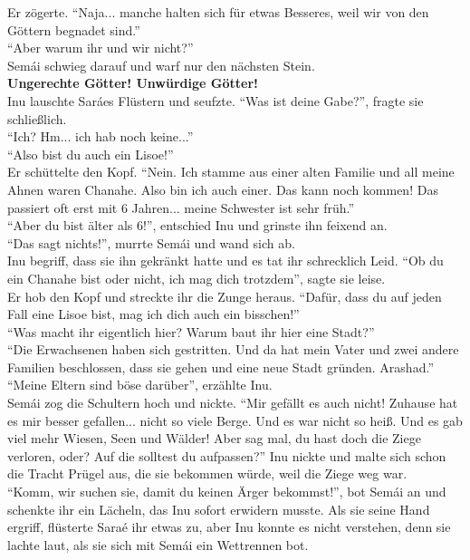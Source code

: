 Er zögerte. ``Naja... manche halten sich für etwas Besseres, weil wir von den Göttern begnadet 
sind.''\\
``Aber warum ihr und wir nicht?''\\
Semái schwieg darauf und warf nur den nächsten Stein.\\
\textbf{Ungerechte Götter! Unwürdige Götter!}\\
Inu lauschte Saráes Flüstern und seufzte. ``Was ist deine Gabe?'', fragte sie schließlich.\\
``Ich? Hm... ich hab noch keine...''\\
``Also bist du auch ein Lisoe!''\\
Er schüttelte den Kopf. ``Nein. Ich stamme aus einer alten Familie und all meine Ahnen waren 
Chanahe. Also bin ich auch einer. Das kann noch kommen! Das passiert oft erst mit 6 Jahren... meine 
Schwester ist sehr früh.''\\
``Aber du bist älter als 6!'', entschied Inu und grinste ihn feixend an.\\
``Das sagt nichts!'', murrte Semái und wand sich ab. \\
Inu begriff, dass sie ihn gekränkt hatte und es tat ihr schrecklich Leid. ``Ob du ein Chanahe bist 
oder nicht, ich mag dich trotzdem'', sagte sie leise.\\
Er hob den Kopf und streckte ihr die Zunge heraus. ``Dafür, dass du auf jeden Fall eine Lisoe bist, 
mag ich dich auch ein bisschen!'' \\
``Was macht ihr eigentlich hier? Warum baut ihr hier eine Stadt?''\\
``Die Erwachsenen haben sich gestritten. Und da hat mein Vater und zwei andere Familien 
beschlossen, dass sie gehen und eine neue Stadt gründen. Arashad.''\\
``Meine Eltern sind böse darüber'', erzählte Inu.\\
Semái zog die Schultern hoch und nickte. ``Mir gefällt es auch nicht! Zuhause hat es mir besser 
gefallen... nicht so viele Berge. Und es war nicht so heiß. Und es gab viel mehr Wiesen, Seen und 
Wälder! Aber sag mal, du hast doch die Ziege verloren, oder? Auf die solltest du aufpassen?''
Inu nickte und malte sich schon die Tracht Prügel aus, die sie bekommen würde, weil die Ziege weg 
war.\\
``Komm, wir suchen sie, damit du keinen Ärger bekommst!'', bot Semái an und schenkte ihr ein 
Lächeln, das Inu sofort erwidern musste. Als sie seine Hand ergriff, flüsterte Saraé ihr etwas zu, 
aber Inu konnte es nicht verstehen, denn sie lachte laut, als sie sich mit Semái ein Wettrennen 
bot. \\

